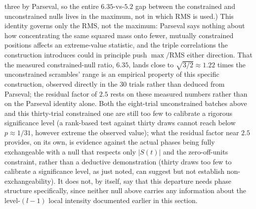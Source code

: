 \documentclass[11pt]{amsart}
\theoremstyle{plain}
\theoremstyle{definition}
\theoremstyle{remark}
\begin{document}
three by Parseval, so the entire $6.35$-vs-$5.2$ gap between the constrained and unconstrained nulls
lives in the maximum, not in which RMS is used.) This
identity governs only the RMS, not the maximum: Parseval says nothing about how concentrating the
same squared mass onto fewer, mutually constrained positions affects an extreme-value statistic, and
the triple correlations the construction introduces could in principle push $\max/\mathrm{RMS}$
either direction. That the measured constrained-null ratio, $6.35$, lands close to $\sqrt{3/2}\approx
1.22$ times the unconstrained scrambles' range is an empirical property of this specific
construction, observed directly in the 30 trials rather than deduced from Parseval; the residual
factor of $2.5$ rests on these measured numbers rather than on the Parseval identity alone.
Both the eight-trial unconstrained batches above and this thirty-trial constrained one are still too
few to calibrate a rigorous significance level (a rank-based test against thirty draws cannot reach
below $p\approx1/31$, however extreme the observed value); what the residual factor near $2.5$
provides, on its own, is evidence against the actual phases being fully exchangeable with a null that
respects only $|S(t)|$ and the zero-off-units constraint, rather than a deductive demonstration
(thirty draws
too few to calibrate a significance level, as just noted, can suggest but not establish
non-exchangeability). It does not, by itself, say that this
departure needs phase structure specifically, since neither null above carries any information about
the level-$(l-1)$ local intensity documented earlier in this section.
\end{document}
